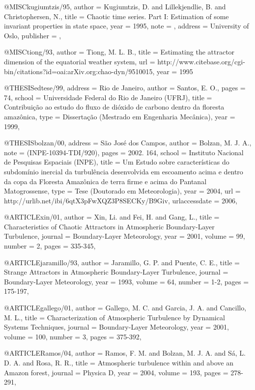 @MISC{kugiumtzis/95,
author 		= {Kugiumtzis, D. and Lillekjendlie, B. and Christophersen, N.},
title     = {Chaotic time series. Part I: Estimation of some invariant properties in state space},
year      = {1995},
note      = {},
address   = {University of Oslo},
publisher = {},
}


@MISC{tiong/93,
  author = {Tiong, M. L. B.},
  title = {Estimating the attractor dimension of the equatorial weather system},
  url = {http://www.citebase.org/cgi-bin/citations?id=oai:arXiv.org:chao-dyn/9510015},
  year = {1995}
}

@THESIS{edtese/99,
  address = {Rio de Janeiro},
  author = {Santos, E. O.}, 
  pages = {74},
  school = {Universidade Federal do Rio de Janeiro (UFRJ)},
  title = {Contribui{\c c}\~ao ao estudo do fluxo de di\'oxido de carbono dentro da floresta amaz\^onica},
  type = {Disserta{\c c}\~ao (Mestrado em Engenharia Mec\^anica)},
  year = {1999},
}


@THESIS{bolzan/00,
  address = {S{\~a}o Jos{\'e} dos Campos},
  author = {Bolzan, M. J. A.}, 
  note = {(INPE-10394-TDI/920)},
  pages = {2002. 164},
  school = {Instituto Nacional de Pesquisas Espaciais (INPE)},
  title = {Um Estudo sobre caracter\'isticas do subdom\'inio inercial da turbul\^encia desenvolvida em escoamento acima e 
	dentro da copa da Floresta Amaz\^onica de terra firme e acima do Pantanal Matogrossense},
  type = {Tese (Doutorado em Meteorologia)},
  year = {2004},
  url = {http://urlib.net/ibi/6qtX3pFwXQZ3P8SECKy/B9Giv},
  urlaccessdate = {2006}, 
}

@ARTICLE{xin/01,
author 		= {Xin, Li. and Fei, H. and Gang, L.},
title 		= {Characteristics of Chaotic Attractors in Atmospheric Boundary-Layer Turbulence},
journal 	= {Boundary-Layer Meteorology},
year 			= {2001},
volume 		= {99},
number    = {2},
pages     = {335-345},
}

@ARTICLE{jaramillo/93,
author 		= {Jaramillo, G. P. and Puente, C. E.},
title		  = {Strange Attractors in Atmospheric Boundary-Layer Turbulence},
journal 	= {Boundary-Layer Meteorology},
year 			= {1993},
volume 		= {64},
number    = {1-2},
pages 		= {175-197},
} 

@ARTICLE{gallego/01,
author 	= {Gallego, M. C. and Garcia, J. A. and Cancillo, M. L.},
title 	= {Characterization of Atmospheric Turbulence by Dynamical Systems Techniques},
journal = {Boundary-Layer Meteorology},
year 		= {2001},
volume 	= {100},
number  = {3},
pages   = {375-392},
}

@ARTICLE{Ramos/04,
author 		= {Ramos, F. M. and Bolzan, M. J. A. and Sá, L. D. A. and Rosa, R. R.},
title		  = {Atmospheric turbulence within and above an Amazon forest},
journal		= {Physica D},
year 			= {2004},
volume 		= {193},
pages 	  = {278-291},
}

